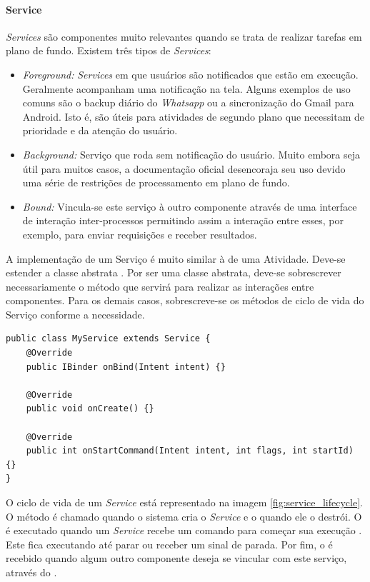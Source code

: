 \documentclass[12pt, a4paper]{article}
\newcommand{\tit}[1]{\textit{#1}}
\begin{document}
    \paragraph{Service}
    \tit{Services} são componentes muito relevantes quando se trata de realizar tarefas em plano de fundo. Existem três tipos de \tit{Services}:\cite{android:services-overview}
    \begin{itemize}[]
        \item \tit{Foreground:} \tit{Services} em que usuários são notificados que estão em execução. Geralmente acompanham uma notificação na tela. Alguns exemplos de uso comuns são o backup diário do \tit{Whatsapp} ou a sincronização do Gmail para Android. Isto é, são úteis para atividades de segundo plano que necessitam de prioridade e da atenção do usuário.
        \item \tit{Background:} Serviço que roda sem notificação do usuário. Muito embora seja útil para muitos casos, a documentação oficial desencoraja seu uso devido uma série de restrições de processamento em plano de fundo.
        \item \tit{Bound:} Vincula-se este serviço à outro componente através de uma interface de interação inter-processos permitindo assim a interação entre esses, por exemplo, para enviar requisições e receber resultados.
    \end{itemize}
 
    A implementação de um Serviço é muito similar à de uma Atividade. Deve-se estender a classe abstrata . Por ser uma classe abstrata, deve-se sobrescrever necessariamente o método  que servirá para realizar as interações entre componentes. Para os demais casos, sobrescreve-se os métodos de ciclo de vida do Serviço conforme a necessidade.\cite{android:service}
    
        \begin{lstlisting}[style=Java]
public class MyService extends Service {
    @Override
    public IBinder onBind(Intent intent) {}
    
    @Override
    public void onCreate() {}
    
    @Override
    public int onStartCommand(Intent intent, int flags, int startId) {}
}
    \end{lstlisting}
    
    O ciclo de vida de um \tit{Service} está representado na imagem \ref{fig:service_lifecycle}. O método  é chamado quando o sistema cria o \tit{Service} e o  quando ele o destrói. O  é executado quando um \tit{Service} recebe um comando para começar sua execução . Este fica executando até parar ou receber um sinal de parada. Por fim, o  é recebido quando algum outro componente deseja se vincular com este serviço, através do .\cite{android:service}
    
\end{document}
